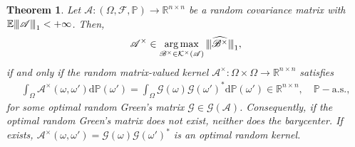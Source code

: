 \documentclass[noinfoline]{imsart}\setcounter{tocdepth}{2}
\renewcommand{\b}[1]{\mathbb{#1}} %
\newcommand{\s}[1]{\mathscr{#1}} %
\renewcommand{\c}[1]{\mathcal{#1}} %
\newcommand{\rd}{\mathrm{d}} %
\DeclareMathOperator*{\argmax}{\arg\max}
\newcommand{\vertiii}[1]{{\left\vert\kern-0.25ex\left\vert\kern-0.25ex\left\vert #1 
    \right\vert\kern-0.25ex\right\vert\kern-0.25ex\right\vert}} %
\newcommand{\vertii}[1]{{\vert\kern-0.25ex\vert\kern-0.25ex\vert #1 
    \vert\kern-0.25ex\vert\kern-0.25ex\vert}} %
\theoremstyle{plain}
\newtheorem{theorem}{Theorem}[section]
\begin{document}
\begin{theorem}\label{thm:multi:trans}
Let $\s{A}: (\Omega, \s{F}, \b{P}) \to \b{R}^{n \times n}$ be a random covariance matrix with $\b{E} \vertiii{\s{A}}_{1} < +\infty$. Then, 
\begin{align*}
    \s{A}^{\times} \in \argmax_{\s{B}^{\times} \in \c{K}^{\times}(\s{A})} \vertii{\widehat{\s{B}^{\times}}}_{1},
\end{align*}
if and only if the random matrix-valued kernel $\s{A}^{\times}: \Omega \times \Omega \to \b{R}^{n \times n}$ satisfies
\begin{align*}
    \int_{\Omega} \s{A}^{\times}(\omega, \omega') \rd \b{P}(\omega') = \int_{\Omega} \s{G}(\omega)  \s{G}(\omega')^{*} \rd \b{P}(\omega') \in \b{R}^{n \times n}, \quad \b{P}-\text{a.s.},
\end{align*}
for some optimal random Green's matrix $\s{G} \in \c{G}(\s{A})$. Consequently, if the optimal random Green's matrix does not exist, neither does the barycenter. If exists, $\s{A}^{\times}(\omega, \omega') = \s{G}(\omega)  \s{G}(\omega')^{*}$ is an optimal random kernel.
\end{theorem}
\end{document}
